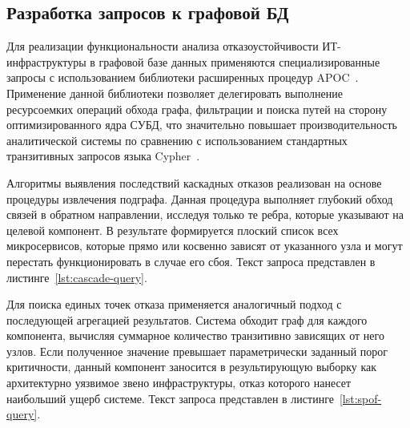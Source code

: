 \subsection{Разработка запросов к графовой БД}
Для реализации функциональности анализа отказоустойчивости ИТ-инфраструктуры в графовой 
базе данных применяются специализированные запросы с использованием библиотеки 
расширенных процедур APOC~\cite{ref:apoc}. Применение данной библиотеки позволяет делегировать 
выполнение ресурсоемких операций обхода графа, фильтрации и поиска путей на сторону 
оптимизированного ядра СУБД, что значительно повышает производительность аналитической 
системы по сравнению с использованием стандартных транзитивных запросов языка 
Cypher~\cite{ref:cypher}.

Алгоритмы выявления последствий каскадных отказов реализован на основе процедуры 
извлечения подграфа. Данная процедура 
выполняет глубокий обход связей в обратном направлении, исследуя только те ребра, 
которые указывают на целевой компонент. В результате формируется плоский 
список всех микросервисов, которые прямо или косвенно зависят от указанного узла и 
могут перестать функционировать в случае его сбоя. Текст запроса представлен в 
листинге~\ref{lst:cascade-query}.


Для поиска единых точек отказа применяется аналогичный подход с последующей агрегацией 
результатов. Система обходит граф для каждого компонента, вычисляя суммарное количество 
транзитивно зависящих от него узлов. Если полученное значение превышает параметрически 
заданный порог критичности, данный компонент заносится в результирующую выборку как 
архитектурно уязвимое звено инфраструктуры, отказ которого нанесет наибольший ущерб системе.
Текст запроса представлен в листинге~\ref{lst:spof-query}.



